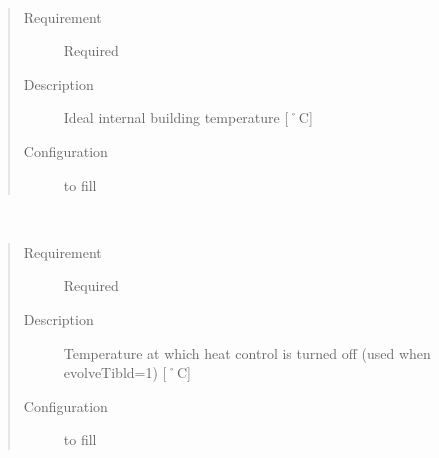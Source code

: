 \documentclass[letterpaper,10pt,english]{sphinxmanual}
\begin{document}

\begin{fulllineitems}
\label{\detokenize{input_files/ESTM_related_files/ESTMinput:cmdoption-arg-theat-fix}}~\begin{quote}\begin{description}
\item[{Requirement}] \leavevmode
Required

\item[{Description}] \leavevmode
Ideal internal building temperature {[}˚C{]}

\item[{Configuration}] \leavevmode
to fill

\end{description}\end{quote}

\end{fulllineitems}


\begin{fulllineitems}
\label{\detokenize{input_files/ESTM_related_files/ESTMinput:cmdoption-arg-theat-off}}~\begin{quote}\begin{description}
\item[{Requirement}] \leavevmode
Required

\item[{Description}] \leavevmode
Temperature at which heat control is turned off (used when evolveTibld=1) {[}˚C{]}

\item[{Configuration}] \leavevmode
to fill

\end{description}\end{quote}

\end{fulllineitems}

\end{document}
